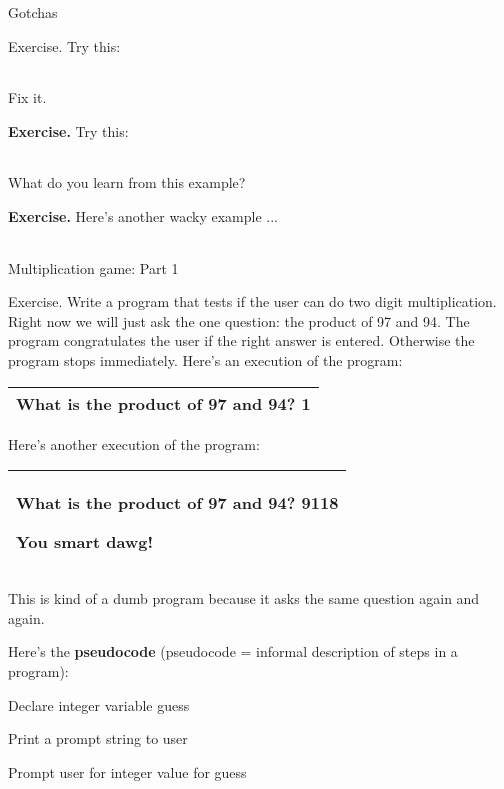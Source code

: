 \documentclass[
]{article}
\begin{document}
Gotchas

Exercise. Try this:

\begin{longtable}[]{@{}@{}}
\toprule
\endhead
\bottomrule
\end{longtable}

Fix it.

\textbf{Exercise.} Try this:

\begin{longtable}[]{@{}@{}}
\toprule
\endhead
\bottomrule
\end{longtable}

What do you learn from this example?

\textbf{Exercise.} Here's another wacky example ...

\begin{longtable}[]{@{}@{}}
\toprule
\endhead
\bottomrule
\end{longtable}

Multiplication game: Part 1

Exercise. Write a program that tests if the user can do two digit
multiplication. Right now we will just ask the one question: the product
of 97 and 94. The program congratulates the user if the right answer is
entered. Otherwise the program stops immediately. Here's an execution of
the program:

\begin{longtable}[]{@{}l@{}}
\toprule
\endhead
What is the product of 97 and 94? \textbf{1}\tabularnewline
\bottomrule
\end{longtable}

Here's another execution of the program:

\begin{longtable}[]{@{}l@{}}
\toprule
\endhead
\begin{minipage}[t]{0.97\columnwidth}\raggedright
What is the product of 97 and 94? \textbf{9118}

You smart dawg!\strut
\end{minipage}\tabularnewline
\bottomrule
\end{longtable}

This is kind of a dumb program because it asks the same question again
and again.

Here's the \textbf{pseudocode} (pseudocode = informal description of
steps in a program):

Declare integer variable guess

Print a prompt string to user

Prompt user for integer value for guess
\end{document}
